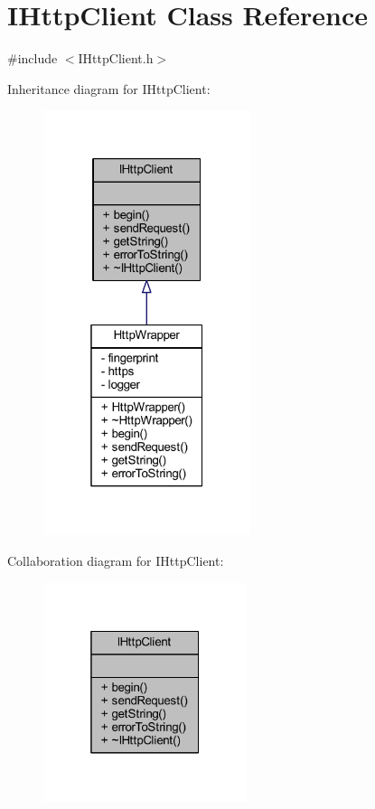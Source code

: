 \hypertarget{class_i_http_client}{}\section{I\+Http\+Client Class Reference}
\label{class_i_http_client}


{\ttfamily \#include $<$I\+Http\+Client.\+h$>$}



Inheritance diagram for I\+Http\+Client\+:
\nopagebreak
\begin{figure}[H]
\begin{center}
\leavevmode
\includegraphics[width=172pt]{class_i_http_client__inherit__graph}
\end{center}
\end{figure}


Collaboration diagram for I\+Http\+Client\+:
\nopagebreak
\begin{figure}[H]
\begin{center}
\leavevmode
\includegraphics[width=169pt]{class_i_http_client__coll__graph}
\end{center}
\end{figure}
